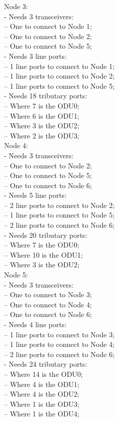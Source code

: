 Node 3:\\
- Needs 3 transceivers:\\
-- One to connect to Node 1;\\
-- One to connect to Node 2;\\
-- One to connect to Node 5;\\
- Needs 3 line ports:\\
-- 1 line ports to connect to Node 1;\\
-- 1 line ports to connect to Node 2;\\
-- 1 line ports to connect to Node 5;\\
- Needs 18 tributary ports:\\
-- Where 7 is the ODU0;\\
-- Where 6 is the ODU1;\\
-- Where 3 is the ODU2;\\
-- Where 2 is the ODU3;\\

Node 4:\\
- Needs 3 transceivers:\\
-- One to connect to Node 2;\\
-- One to connect to Node 5;\\
-- One to connect to Node 6;\\
- Needs 5 line ports:\\
-- 2 line ports to connect to Node 2;\\
-- 1 line ports to connect to Node 5;\\
-- 2 line ports to connect to Node 6;\\
- Needs 20 tributary ports:\\
-- Where 7 is the ODU0;\\
-- Where 10 is the ODU1;\\
-- Where 3 is the ODU2;\\

Node 5:\\
- Needs 3 transceivers:\\
-- One to connect to Node 3;\\
-- One to connect to Node 4;\\
-- One to connect to Node 6;\\
- Needs 4 line ports:\\
-- 1 line ports to connect to Node 3;\\
-- 1 line ports to connect to Node 4;\\
-- 2 line ports to connect to Node 6;\\
- Needs 24 tributary ports:\\
-- Where 14 is the ODU0;\\
-- Where 4 is the ODU1;\\
-- Where 4 is the ODU2;\\
-- Where 1 is the ODU3;\\
-- Where 1 is the ODU4;\\

